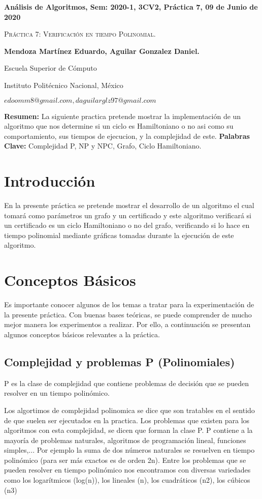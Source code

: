 \documentclass[12pt,twoside]{article}
\date{}
\begin{document}
\centerline{\bf An\'alisis de Algoritmos, Sem: 2020-1, 3CV2, Pr\'actica 7, 09 de Junio de 2020}
\centerline{}
\centerline{}
\begin{center}
\Large{\textsc{Práctica 7: Verificación en tiempo Polinomial.}}
\end{center}
\centerline{}
\centerline{\bf {Mendoza Mart\'inez Eduardo, Aguilar Gonzalez Daniel.}}
\centerline{}
\centerline{Escuela Superior de C\'omputo}
\centerline{Instituto Polit\'ecnico Nacional, M\'exico}
\centerline{$edoomm8@gmail.com, daguilarglz97@gmail.com$}
\newtheorem{Theorem}{\quad Theorem}[section]
\newtheorem{Definition}[Theorem]{\quad Definition}
\newtheorem{Corollary}[Theorem]{\quad Corollary}
\newtheorem{Lemma}[Theorem]{\quad Lemma}
\newtheorem{Example}[Theorem]{\quad Example}
\bigskip
\textbf{Resumen:} La siguiente pr\´actica pretende mostrar la implementación de un algoritmo que nos determine si un ciclo es Hamiltoniano o no asi como su comportamiento, sus tiempos de ejecuci\´on, y la complejidad de este. \newline
{\bf Palabras Clave:} Complejidad P, NP y NPC, Grafo, Ciclo Hamiltoniano.
\section{Introducci\'on}
En la presente práctica se pretende mostrar el desarrollo de un algoritmo el cual tomará como parámetros un grafo y un certificado y este algoritmo verificará si un certificado es un ciclo Hamiltoniano o no del grafo, verificando si lo hace en tiempo polinomial mediante gráficas tomadas durante la ejecución de este algoritmo.

\section{Conceptos B\'asicos}
Es importante conocer algunos de los temas a tratar para la experimentación de la presente práctica. Con buenas bases teóricas, se puede comprender de mucho mejor manera los experimentos a realizar. Por ello, a continuación se presentan algunos conceptos básicos relevantes a la práctica.

\subsection{Complejidad y problemas P (Polinomiales)}
P es la clase de complejidad que contiene problemas de decisión que se pueden resolver en un tiempo polinómico.

Los algortimos de complejidad polinomica se dice que son tratables en el sentido de que suelen ser ejecutados en la practica.
Los problemas que existen para los algoritmos con esta complejidad, se dicen que forman la clase P.
P contiene a la mayoría de problemas naturales, algoritmos de programación lineal, funciones simples,... Por ejemplo la suma de dos números naturales se resuelven en tiempo polinómico (para ser más exactos es de orden 2n). Entre los problemas que se pueden resolver en tiempo polinómico nos encontramos con diversas variedades como los logarítmicos (log(n)), los lineales (n), los cuadráticos (n2), los cúbicos (n3)
\end{document}
